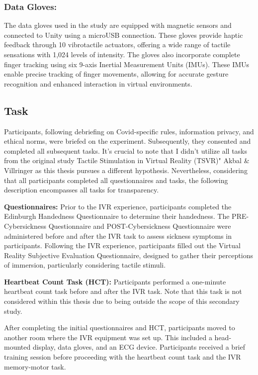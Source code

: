 \documentclass[12pt,oneside,openright]{report}
\begin{document}
\subsubsection*{Data Gloves:}
The data gloves used in the study are equipped with magnetic sensors and connected to Unity using a microUSB connection. These gloves provide haptic feedback through 10 vibrotactile actuators, offering a wide range of tactile sensations with 1,024 levels of intensity. The gloves also incorporate complete finger tracking using six 9-axis Inertial Measurement Units (IMUs). These IMUs enable precise tracking of finger movements, allowing for accurate gesture recognition and enhanced interaction in virtual environments.


\subsection*{Task}

Participants, following debriefing on Covid-specific rules, information privacy, and ethical norms, were briefed on the experiment. Subsequently, they consented and completed all subsequent tasks. It's crucial to note that I didn't utilize all tasks from the original study Tactile Stimulation in Virtual Reality (TSVR)" Akbal \& Villringer as this thesis pursues a different hypothesis. Nevertheless, considering that all participants completed all questionnaires and tasks, the following description encompasses all tasks for transparency.

\textbf{Questionnaires:} Prior to the IVR experience, participants completed the Edinburgh Handedness Questionnaire to determine their handedness. The PRE-Cybersickness Questionnaire and POST-Cybersickness Questionnaire were administered before and after the IVR task to assess sickness symptoms in participants. Following the IVR experience, participants filled out the Virtual Reality Subjective Evaluation Questionnaire, designed to gather their perceptions of immersion, particularly considering tactile stimuli. 

\textbf{Heartbeat Count Task (HCT):} Participants performed a one-minute heartbeat count task before and after the IVR task. Note that this task is not considered within this thesis due to being outside the scope of this secondary study.

After completing the initial questionnaires and HCT, participants moved to another room where the IVR equipment was set up. This included a head-mounted display, data gloves, and an ECG device. Participants received a brief training session before proceeding with the heartbeat count task and the IVR memory-motor task.
\end{document}
